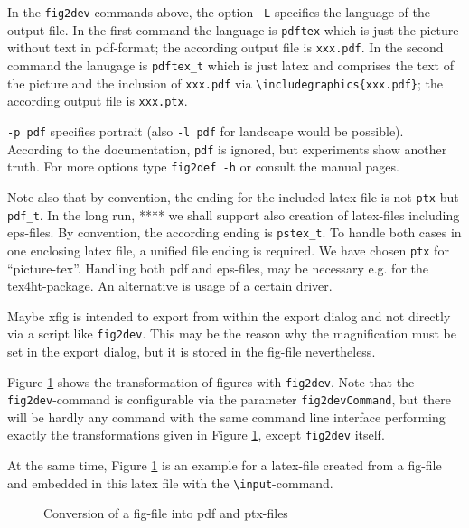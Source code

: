 \documentclass[12pt]{article}
\begin{document}
In the {\tt fig2dev}-commands above, 
the option {\tt -L} specifies the language of the output file. 
In the first command the language is {\tt pdftex} 
which is just the picture without text in pdf-format; 
the according output file is  {\tt xxx.pdf}. 
In the second command the lanugage is {\tt pdftex\_t} 
which is just latex and 
comprises the text of the picture and the inclusion of {\tt xxx.pdf}
via {\tt\textbackslash includegraphics\{xxx.pdf\}}; 
the according output file is {\tt xxx.ptx}. 

{\tt -p pdf} specifies portrait 
(also {\tt -l pdf} for landscape would be possible). 
According to the documentation, {\tt pdf} is ignored, 
but experiments show another truth. 
For more options type {\tt fig2def -h} or consult the manual pages. 


Note also that by convention, the ending for the included latex-file 
is not {\tt ptx} but {\tt pdf\_t}. 
In the long run, **** we shall support also creation of latex-files 
including \gls{eps}-files. 
By convention, the according ending is {\tt pstex\_t}. 
To handle both cases in one enclosing latex file, 
a unified file ending is required. 
We have chosen {\tt ptx} for ``picture-tex''. 
Handling both \gls{pdf} and \gls{eps}-files, 
may be necessary e.g. for the tex4ht-package. 
An alternative is usage of a certain driver. 


Maybe xfig is intended to export from within the export dialog 
and not directly via a script like {\tt fig2dev}. 
This may be the reason 
why the magnification must be set in the export dialog, 
but it is stored in the fig-file nevertheless. 

Figure \ref{fig:fig2dev} shows the transformation 
of figures with {\tt fig2dev}. 
Note that the {\tt fig2dev}-command is configurable 
via the parameter {\tt fig2devCommand}, 
but there will be hardly any command with the same command line interface 
performing exactly the transformations given in Figure \ref{fig:fig2dev}, 
except {\tt fig2dev} itself. 

At the same time, Figure \ref{fig:fig2dev} is an example 
for a latex-file created from a fig-file 
and embedded in this latex file 
with the {\tt\textbackslash input}-command. 


\begin{figure}[htb]
\begin{center}

\end{center}
\caption{\label{fig:fig2dev}Conversion of a fig-file into pdf and ptx-files}
\end{figure}
\end{document}
